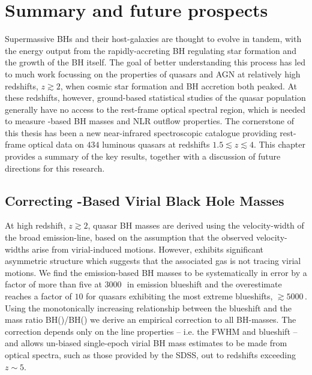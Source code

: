 
\chapter{Summary and future prospects}
\label{ch:summary} 


Supermassive BHs and their host-galaxies are thought to evolve in tandem, with the energy output from the rapidly-accreting BH regulating star formation and the growth of the BH itself. 
The goal of better understanding this process has led to much work focussing on the properties of quasars and AGN at relatively high redshifts, $z\gtrsim 2$, when cosmic star formation and BH accretion both peaked. 
At these redshifts, however, ground-based statistical studies of the quasar population generally have no access to the rest-frame optical spectral region, which is needed to measure \hbns-based BH masses and NLR outflow properties. 
The cornerstone of this thesis has been a new near-infrared spectroscopic catalogue providing rest-frame optical data on $434$ luminous quasars at redshifts $1.5 \lesssim z \lesssim 4$.
This chapter provides a summary of the key results, together with a discussion of future directions for this research. 

\section{Correcting -Based Virial Black Hole Masses}

At high redshift, $z \gtrsim 2$, quasar BH masses are derived using the velocity-width of the  broad emission-line, based on the assumption that the observed velocity-widths arise from virial-induced motions.  
However,  exhibits significant asymmetric structure which suggests that the associated gas is not tracing virial motions. 
We find the  emission-based BH masses to be systematically in error by a factor of more than five at $3000$\,\kms\, in  emission blueshift and the overestimate reaches a factor of $10$ for quasars exhibiting the most extreme blueshifts, $\gtrsim5000$\,\kms. 
Using the monotonically increasing relationship between the  blueshift and the mass ratio BH()/BH(\hans) we derive an empirical correction to all  BH-masses.
The correction depends only on the  line properties -- i.e. the FWHM and blueshift -- and allows un-biased single-epoch virial BH mass estimates to be made from optical spectra, such as those provided by the SDSS, out to redshifts exceeding $z\sim 5$. 

